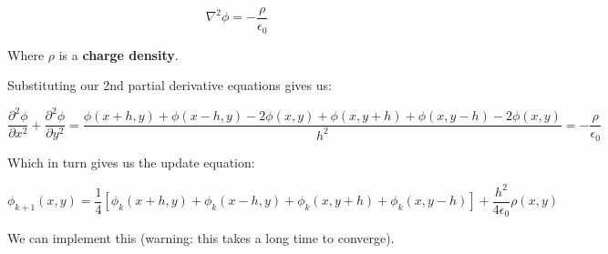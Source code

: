 \[\nabla^2 \phi = -\frac{\rho}{\epsilon_0}\]

Where \(\rho\) is a \textbf{charge density}.

Substituting our 2nd partial derivative equations gives us:

\[
\frac{\partial^2 \phi}{\partial x^2} + \frac{\partial^2 \phi}{\partial y^2}  = \frac{\phi(x+h,y) + \phi(x-h,y) - 2\phi(x,y) + \phi(x,y+h) + \phi(x,y-h) - 2\phi(x,y)}{h^2} = -\frac{\rho}{\epsilon_0}
\]

Which in turn gives us the update equation:

\[
\phi_{k+1}(x,y) = \frac{1}{4}\left[\phi_{k}(x+h,y) + \phi_{k}(x-h,y) + \phi_{k}(x,y+h) + \phi_{k}(x,y-h) \right] + \frac{h^2}{4\epsilon_0} \rho(x,y)
\]

We can implement this (warning: this takes a long time to converge).

